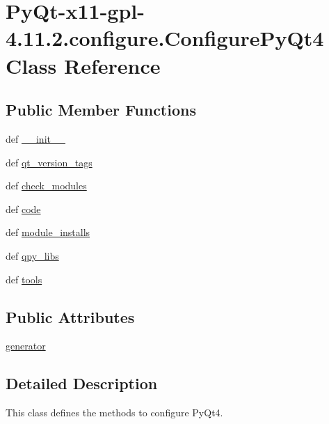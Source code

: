 \hypertarget{classPyQt-x11-gpl-4_811_82_1_1configure_1_1ConfigurePyQt4}{}\section{Py\+Qt-\/x11-\/gpl-\/4.11.2.configure.\+Configure\+Py\+Qt4 Class Reference}
\label{classPyQt-x11-gpl-4_811_82_1_1configure_1_1ConfigurePyQt4}
\subsection*{Public Member Functions}
\begin{DoxyCompactItemize}
\item 
def \hyperlink{classPyQt-x11-gpl-4_811_82_1_1configure_1_1ConfigurePyQt4_aff3e2166792a0a020d49476d3e8c2c67}{\+\_\+\+\_\+init\+\_\+\+\_\+}
\item 
def \hyperlink{classPyQt-x11-gpl-4_811_82_1_1configure_1_1ConfigurePyQt4_a6b1ced34afdac23c53d803fe9370eb51}{qt\+\_\+version\+\_\+tags}
\item 
def \hyperlink{classPyQt-x11-gpl-4_811_82_1_1configure_1_1ConfigurePyQt4_a5a4abb3a9ff120599ecade692d0a0c77}{check\+\_\+modules}
\item 
def \hyperlink{classPyQt-x11-gpl-4_811_82_1_1configure_1_1ConfigurePyQt4_ae6c6e460ec4579db2b46804ecc585ea4}{code}
\item 
def \hyperlink{classPyQt-x11-gpl-4_811_82_1_1configure_1_1ConfigurePyQt4_a599a4c98b2855137921c614b8fcb965d}{module\+\_\+installs}
\item 
def \hyperlink{classPyQt-x11-gpl-4_811_82_1_1configure_1_1ConfigurePyQt4_a677521bbcb669e9503f452bd01dc220d}{qpy\+\_\+libs}
\item 
def \hyperlink{classPyQt-x11-gpl-4_811_82_1_1configure_1_1ConfigurePyQt4_a3a13b7944dc8f43f7868e856e116d6e4}{tools}
\end{DoxyCompactItemize}
\subsection*{Public Attributes}
\begin{DoxyCompactItemize}
\item 
\hyperlink{classPyQt-x11-gpl-4_811_82_1_1configure_1_1ConfigurePyQt4_ab6fba0211aeb840ec01d259082696b22}{generator}
\end{DoxyCompactItemize}


\subsection{Detailed Description}
\begin{DoxyVerb}This class defines the methods to configure PyQt4.
\end{DoxyVerb}
 

